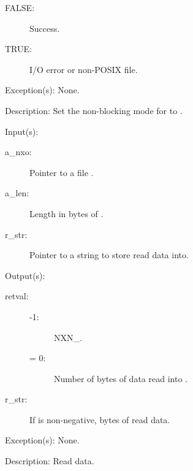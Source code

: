 \begin{capi}
\begin{capilist}
\begin{description}
			\begin{description}\item[]
			\item[FALSE: ]
				Success.
			\item[TRUE: ]
				I/O error or non-POSIX file.
			\end{description}
		\end{description}
	\item[Exception(s): ] None.
	\item[Description: ]
		Set the non-blocking mode for  to
		.
	\end{capilist}
\label{nxo_file_read}
	\begin{capilist}
	\item[Input(s): ]
		\begin{description}\item[]
		\item[a\_nxo: ]
			Pointer to a file .
		\item[a\_len: ]
			Length in bytes of .
		\item[r\_str: ]
			Pointer to a string to store read data into.
		\end{description}
	\item[Output(s): ]
		\begin{description}\item[]
		\item[retval: ]
			\begin{description}\item[]
			\item[-1: ]
				NXN\_.
			\item[{\gt}= 0: ]
				Number of bytes of data read into .
			\end{description}\item[]
		\item[r\_str: ]
			If  is non-negative,  bytes of
			read data.
		\end{description}
	\item[Exception(s): ] None.
	\item[Description: ]
		Read data.
	\end{capilist}
\label{nxo_file_readline}
\end{capi}
